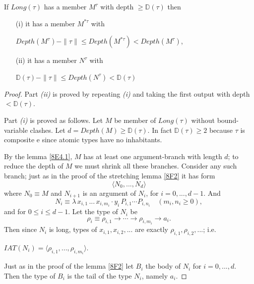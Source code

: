 \documentclass[a4paper,10pt]{article}
\begin{document}
\begin{lem}\label{8F3} If $Long(\tau)$ has a member $M^{\tau}$ with depth $\geq \mathbb{D}(\tau)$ then
 \begin{itemize}
  \item[(i)] it has a member $M^{*\tau}$ with
  \begin{center}
    $Depth(M^{\tau}) - \rVert\tau\rVert \leq Depth(M^{*\tau}) < Depth(M^{\tau})$,
  \end{center}
  \item[(ii)] it has a member $N^{\tau}$ with
  \begin{center}
   $\mathbb{D}(\tau) - \rVert\tau\rVert \leq Depth(N^{\tau}) < \mathbb{D}(\tau)$
  \end{center}
 \end{itemize}
\begin{proof}
 Part {\em (ii)} is proved by repeating {\em (i)} and taking the first output with depth $< \mathbb{D}(\tau)$.

 Part {\em (i)} is proved as follows. Let $M$ be member of $Long(\tau)$ without bound-variable clashes.
 Let $d = Depth(M) \geq \mathbb{D}(\tau)$. In fact $\mathbb{D}(\tau) \geq 2$ because $\tau$ is composite e since atomic types have no inhabitants.

 By the lemma \ref{8E4.1}, $M$ has at least one argument-branch with length $d$; to reduce the depth of $M$
 we must shrink all these branches. Consider any such branch; just as in the proof of the stretching lemma \ref{8F2} it has form
\begin{equation}\label{eq8}
  \langle N_0, ..., N_d \rangle
 \end{equation}
where $N_0 \equiv M$ and $N_{i+1}$ is an argument of $N_i$, for $i = 0, ..., d - 1$. And
\begin{equation}\label{eq9}
 N_i \equiv \lambda\,x_{i,1}\,...\,x_{i,m_i}\cdot y_i\,P_{i,1}\cdots P_{i,n_i}\,\,\,\,\,\,(m_i,n_i \geq 0),
\end{equation}
and for $0 \leq i \leq d - 1$. Let the type of $N_i$ be
\begin{equation}\label{eq10}
 \rho_i \equiv \rho_{i,1} \to \cdots \to \rho_{i,m_i} \to a_i . 
\end{equation}
 Then since $N_i$ is long, types of $x_{i,1}, x_{i,2}, ...$ are exactly $\rho_{i,1}, \rho_{i,2}, ...$; i.e.
\begin{center}
 $IAT(N_i) = \langle \rho_{i,1}, ...,  \rho_{i,m_i} \rangle$.
\end{center}
Just as in the proof of the lemma \ref{8F2} let $B_i$ the body of $N_i$ for $i = 0, ..., d$. Then the type of $B_i$
is the tail of the type $N_i$, namely $a_i$.


\end{proof}
\end{lem}
\end{document}
